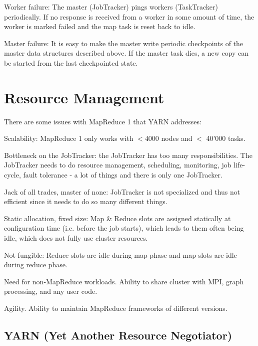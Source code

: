 \documentclass[11pt,oneside,a4paper]{article}
\begin{document}
\begin{compactitem}
\item Worker failure: The master (JobTracker) pings workers (TaskTracker) periodically. If no response is received from a worker in some amount of time, the worker is marked failed and the map task is reset back to idle.
\item Master failure: It is easy to make the master write periodic checkpoints of the master data structures described above. If the master task dies, a new copy can be started from the last checkpointed state.
\end{compactitem}

\newpage

\section{Resource Management}

There are some issues with MapReduce 1 that YARN addresses:

\begin{compactitem}
\item Scalability: MapReduce 1 only works with $<$4000 nodes and $<$ 40'000 tasks.
\item Bottleneck on the JobTracker: the JobTracker has too many responsibilities. The JobTracker needs to do resource management, scheduling, monitoring, job life-cycle, fault tolerance - a lot of things and there is only one JobTracker.
\item Jack of all trades, master of none: JobTracker is not specialized and thus not efficient since it needs to do so many different things.
\item Static allocation, fixed size: Map \& Reduce slots are assigned statically at configuration time (i.e. before the job starts), which leads to them often being idle, which does not fully use cluster resources.
\item Not fungible: Reduce slots are idle during map phase and map slots are idle during reduce phase.
\item Need for non-MapReduce workloads. Ability to share cluster with MPI, graph processing, and any user code.
\item Agility. Ability to maintain MapReduce frameworks of different versions.\\
\end{compactitem}

\subsection{YARN (Yet Another Resource Negotiator)}
\end{document}
